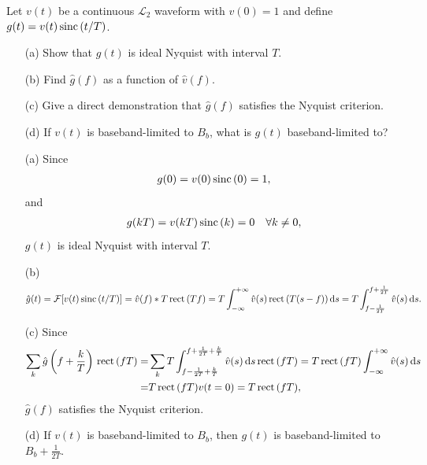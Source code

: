 \documentclass{assignment}
\begin{document}
\begin{prob}[6.5, Nyquist]
    Let $v(t)$ be a continuous $\mathcal{L}_2$ waveform with $v(0)=1$ and define $g(t)=v(t)\,\text{sinc}\,(t/T)$.
    \begin{itemize}
        \item[(a)] Show that $g(t)$ is ideal Nyquist with interval $T$.
        \item[(b)] Find $\hat{g}(f)$ as a function of $\hat{v}(f)$.
        \item[(c)] Give a direct demonstration that $\hat{g}(f)$ satisfies the Nyquist criterion.
        \item[(d)] If $v(t)$ is baseband-limited to $B_b$, what is $g(t)$ baseband-limited to?
    \end{itemize}
\end{prob}
\begin{sol}
    \begin{itemize}
        \item[(a)] Since
        \begin{align}
            g(0)=v(0)\,\text{sinc}\,(0)=1,
        \end{align}
        and
        \begin{align}
            g(kT)=v(kT)\,\text{sinc}\,(k)=0\quad\forall k\neq 0,
        \end{align}
        $g(t)$ is ideal Nyquist with interval $T$.
        \item[(b)] 
        \begin{align}
            \hat{g}(t)=\mathcal{F}[v(t)\,\text{sinc}\,(t/T)]=\hat{v}(f)*T\,\text{rect}\,(Tf)=T\int_{-\infty}^{+\infty}\hat{v}(s)\,\text{rect}\,(T(s-f))\,\mathrm{d}s=T\int_{f-\frac{1}{2T}}^{f+\frac{1}{2T}}\hat{v}(s)\,\mathrm{d}s.
        \end{align}
        \item[(c)] Since
        \begin{align}
            \notag\sum_k\hat{g}\left(f+\frac{k}{T}\right)\,\text{rect}\,(fT)=&\sum_kT\int_{f-\frac{1}{2T}+\frac{k}{T}}^{f+\frac{1}{2T}+\frac{k}{T}}\hat{v}(s)\,\mathrm{d}s\,\text{rect}\,(fT)=T\,\text{rect}\,(fT)\int_{-\infty}^{+\infty}\hat{v}(s)\,\mathrm{d}s\\
            =&T\,\text{rect}\,(fT)v(t=0)=T\,\text{rect}\,(fT),
        \end{align}
        $\hat{g}(f)$ satisfies the Nyquist criterion.
        \item[(d)] If $v(t)$ is baseband-limited to $B_b$, then $g(t)$ is baseband-limited to $B_b+\frac{1}{2T}$.
    \end{itemize}
\end{sol}
\end{document}
